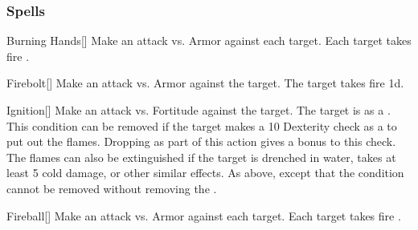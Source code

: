 \subsubsection{Spells}


\lowercase{\hypertarget{spell:Burning Hands}{}}\label{spell:Burning Hands}
\begin{freeability}[Rank 1]{\hypertarget{spell:Burning Hands}{Burning Hands}}[]
Make an attack vs. Armor against each target.
\hit Each target takes fire .
\end{freeability}
\vspace{0.25em}



\lowercase{\hypertarget{spell:Firebolt}{}}\label{spell:Firebolt}
\begin{freeability}[Rank 1]{\hypertarget{spell:Firebolt}{Firebolt}}[]
Make an attack vs. Armor against the target.
\hit The target takes fire  \plus1d.
\end{freeability}
\vspace{0.25em}



\lowercase{\hypertarget{spell:Ignition}{}}\label{spell:Ignition}
\begin{freeability}[Rank 1]{\hypertarget{spell:Ignition}{Ignition}}[]
Make an attack vs. Fortitude against the target.
\hit The target is  as a .
This condition can be removed if the target makes a  10 Dexterity check as a  to put out the flames.
Dropping  as part of this action gives a  bonus to this check.
The flames can also be extinguished if the target is drenched in water, takes at least 5 cold damage, or other similar effects.
\crit As above, except that the condition cannot be removed without removing the .
\end{freeability}
\vspace{0.25em}



\lowercase{\hypertarget{spell:Fireball}{}}\label{spell:Fireball}
\begin{freeability}[Rank 3]{\hypertarget{spell:Fireball}{Fireball}}[]
Make an attack vs. Armor against each target.
\hit Each target takes fire .
\end{freeability}
\vspace{0.25em}



